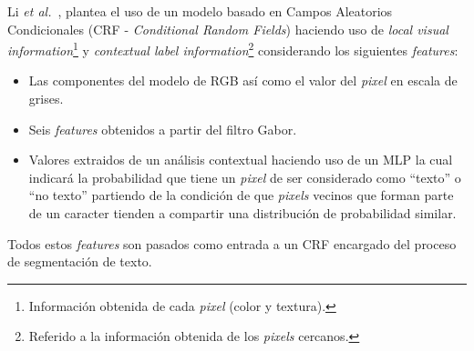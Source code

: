 Li \textit{et al.}~\cite{Li:2010:CRFforTS}, plantea el uso de un modelo basado
en Campos Aleatorios Condicionales (CRF - \textit{Conditional Random Fields})
haciendo uso de \textit{local visual information}\footnote{Información obtenida
de cada \textit{pixel} (color y textura).} y \textit{contextual label
information}\footnote{Referido a la información obtenida de los \textit{pixels}
cercanos.} considerando los siguientes \textit{features}:
\begin{itemize}
	\item Las componentes del modelo de RGB así como el valor del \textit{pixel}
en escala de grises.
	\item Seis \textit{features} obtenidos a partir del filtro Gabor.
	\item Valores extraidos de un análisis contextual haciendo uso de un MLP la
cual indicará la probabilidad que tiene un \textit{pixel} de ser considerado
como ``texto'' o ``no texto'' partiendo de la condición de que \textit{pixels}
vecinos que forman parte de un caracter tienden a compartir una distribución de
probabilidad similar.
\end{itemize}

Todos estos \textit{features} son pasados como entrada a un CRF encargado del
proceso de segmentación de texto.

